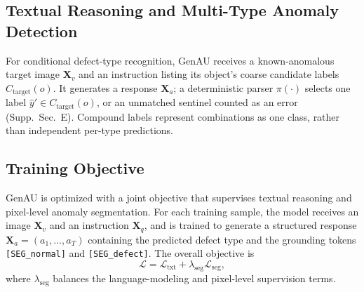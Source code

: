 \subsection{Textual Reasoning and Multi-Type Anomaly Detection}
For conditional defect-type recognition, GenAU receives a known-anomalous target image $\mathbf{X}_v$ and an instruction listing its object's coarse candidate labels $C_{\mathrm{target}}(o)$. It generates a response $\mathbf{X}_a$; a deterministic parser $\pi(\cdot)$ selects one label $\hat{y}'\in C_{\mathrm{target}}(o)$, or an unmatched sentinel counted as an error (Supp.~Sec.~E). Compound labels represent combinations as one class, rather than independent per-type predictions.

\subsection{Training Objective}

GenAU is optimized with a joint objective that supervises textual reasoning and pixel-level anomaly segmentation. For each training sample, the model receives an image $\mathbf{X}_v$ and an instruction $\mathbf{X}_q$, and is trained to generate a structured response $\mathbf{X}_a=(a_1,\ldots,a_T)$ containing the predicted defect type and the grounding tokens \texttt{[SEG\_normal]} and \texttt{[SEG\_defect]}. The overall objective is
\begin{equation}
    \mathcal{L}
    =
    \mathcal{L}_{\mathrm{txt}}
    +
    \lambda_{\mathrm{seg}}\mathcal{L}_{\mathrm{seg}},
    \label{eq:overall-loss}
\end{equation}
where $\lambda_{\mathrm{seg}}$ balances the language-modeling and pixel-level supervision terms.

